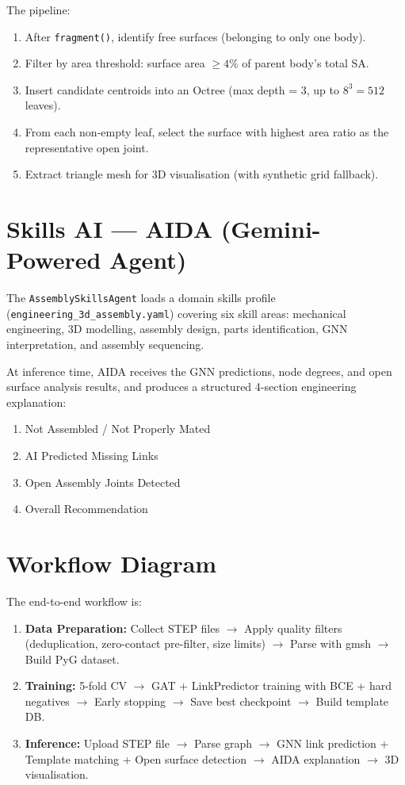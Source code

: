 \documentclass[12pt]{report}
\begin{document}
The pipeline:
\begin{enumerate}
    \item After \texttt{fragment()}, identify free surfaces (belonging to only one body).
    \item Filter by area threshold: surface area $\geq 4\%$ of parent body's total SA.
    \item Insert candidate centroids into an Octree (max depth = 3, up to $8^3 = 512$ leaves).
    \item From each non-empty leaf, select the surface with highest area ratio as the representative open joint.
    \item Extract triangle mesh for 3D visualisation (with synthetic grid fallback).
\end{enumerate}

\section{Skills AI --- AIDA (Gemini-Powered Agent)}

The \texttt{AssemblySkillsAgent} loads a domain skills profile (\texttt{engineering\_3d\_assembly.yaml}) covering six skill areas: mechanical engineering, 3D modelling, assembly design, parts identification, GNN interpretation, and assembly sequencing.

At inference time, AIDA receives the GNN predictions, node degrees, and open surface analysis results, and produces a structured 4-section engineering explanation:
\begin{enumerate}
    \item Not Assembled / Not Properly Mated
    \item AI Predicted Missing Links
    \item Open Assembly Joints Detected
    \item Overall Recommendation
\end{enumerate}

\section{Workflow Diagram}

The end-to-end workflow is:

\begin{enumerate}
    \item \textbf{Data Preparation:} Collect STEP files $\rightarrow$ Apply quality filters (deduplication, zero-contact pre-filter, size limits) $\rightarrow$ Parse with gmsh $\rightarrow$ Build PyG dataset.
    \item \textbf{Training:} 5-fold CV $\rightarrow$ GAT + LinkPredictor training with BCE + hard negatives $\rightarrow$ Early stopping $\rightarrow$ Save best checkpoint $\rightarrow$ Build template DB.
    \item \textbf{Inference:} Upload STEP file $\rightarrow$ Parse graph $\rightarrow$ GNN link prediction + Template matching + Open surface detection $\rightarrow$ AIDA explanation $\rightarrow$ 3D visualisation.
\end{enumerate}
\end{document}
